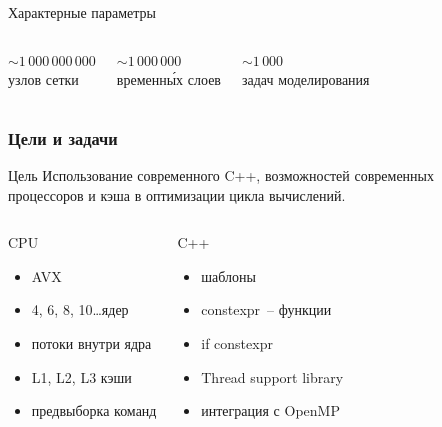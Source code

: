 \documentclass[presentation,18pt]{beamer}
\begin{document}
\begin{frame}[fragile,t]
\begin{columns}
	\end{columns}

	\begin{alertblock}{Характерные параметры}
		\begin{columns}
			$\sim 1\,000\,000\,000$ \\ узлов сетки

			$\sim 1\,000\,000$ \\ временн\'{ы}х слоев

			$\sim 1\,000$ \\ задач моделирования
		\end{columns}
	\end{alertblock}

\end{frame}

\begin{frame}[t]
	\label{goals}
	\frametitle{Цели и задачи}

	\begin{block}{Цель}
		Использование современного C++, возможностей современных процессоров и 
		кэша в оптимизации цикла вычислений.
	\end{block}

	\begin{columns}

	\column{0.4\textwidth}
		\begin{block}{CPU}
			\begin{itemize}
				\item AVX
				\item 4, 6, 8, 10\ldots ядер
				\item потоки внутри ядра
				\item L1, L2, L3 кэши
				\item предвыборка команд
			\end{itemize}
		\end{block}

	\column{0.4\textwidth}
		\begin{block}{C++}
			\begin{itemize}
				\item шаблоны
				\item constexpr~-- функции
				\item if constexpr
				\item Thread support library
				\item интеграция с OpenMP
			\end{itemize}
		\end{block}

	\end{columns}
\end{frame}
\end{document}
